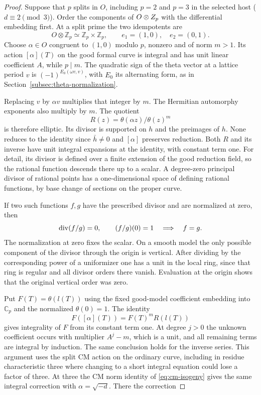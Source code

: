 \begin{proof}

Suppose that \(p\) splits in \(O\), including \(p=2\) and
\(p=3\) in the selected host (\(d\equiv2\pmod3\)).
Order the components of \(O\otimes Z_p\) with the differential
embedding first.
At a split prime the two idempotents are
\[
  O\otimes\mathbb Z_p\simeq\mathbb Z_p\times\mathbb Z_p,\qquad e_1=(1,0),\quad e_2=(0,1).
\]
 Choose \(\alpha\in O\) congruent to \((1,0)\)
modulo \(p\), nonzero and of norm \(m>1\). Its action
\([\alpha](T)\) on the good formal curve is integral and
has unit linear coefficient \(A\), while \(p\mid m\).
The quadratic sign of the theta vector at a lattice period
\(v\) is \((-1)^{E_0(\omega v,v)}\), with \(E_0\) its alternating
form, as in Section~\ref{subsec:theta-normalization}.

Replacing
\(v\) by \(\alpha v\) multiplies that integer by \(m\).
The Hermitian automorphy exponents also multiply by \(m\).
The quotient
\[
             R(z)=\theta(\alpha z)/\theta(z)^m
\]
is therefore elliptic. Its divisor is supported on \(h\) and
the preimages of \(h\). None reduces to the identity since
\(\bar h\ne0\) and \([\alpha]\) preserves reduction. Both
\(R\) and its inverse have unit integral expansions at the
identity, with constant term one. For detail, its divisor is
defined over a finite extension of the good reduction field,
so the rational function descends there up to a scalar.
A degree-zero principal divisor of rational points has a
one-dimensional space of defining rational functions, by base
change of sections on the proper curve.

If two such functions \(f,g\) have the prescribed divisor and are normalized at zero, then
\[
  {\rm div}(f/g)=0,\qquad (f/g)(0)=1\quad\Longrightarrow\quad f=g.
\]
 The normalization at
zero fixes the scalar. On a smooth model the only possible
component of the divisor through the origin is vertical.
After dividing by the corresponding power of a uniformizer
one has a unit in the local ring, since that ring is regular
and all divisor orders there vanish. Evaluation at the origin
shows that the original vertical order was zero.

Put \(F(T)=\theta(l(T))\) using the fixed good-model coefficient
embedding into \(\mathbb C_p\) and the normalized \(\theta(0)=1\). The identity
\[
             F([\alpha](T))=F(T)^m R(l(T))
\]
gives integrality of \(F\) from its constant term one. At degree
\(j>0\) the unknown coefficient occurs with multiplier
\(A^j-m\), which is a unit, and all remaining terms are
integral by induction. The same conclusion holds for the
inverse series. This argument uses the split CM action on the
ordinary curve, including in residue characteristic three
where changing to a short integral equation could lose a
factor of three. At three the CM norm identity of \eqref{eq:cm-isogeny} gives the same integral correction with
\(\alpha=\sqrt{-d}\). There the correction


\end{proof}
